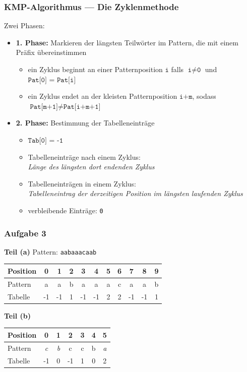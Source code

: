 \documentclass{beamer}
\begin{document}
\begin{frame} \frametitle{KMP-Algorithmus --- Die Zyklenmethode}
	Zwei Phasen:
	\pause
	\begin{itemize}
		\item \textbf{1. Phase:} Markieren der längsten Teilwörter im Pattern, die mit einem Präfix übereinstimmen
		\begin{itemize}
			\item ein Zyklus beginnt an einer Patternposition $\texttt{i}$ falls $\texttt{i} \neq \texttt{0}$ und $\texttt{Pat[0] = Pat[i]}$
			\item ein Zyklus endet an der kleisten Patternposition $\texttt{i+m}$, sodass $\texttt{Pat[m+1]} \neq \texttt{Pat[i+m+1]}$
		\end{itemize}
	\pause
	\item \textbf{2. Phase:} Bestimmung der Tabelleneinträge
	\begin{itemize}
		\item $\texttt{Tab[0] = -1}$
		\item Tabelleneinträge nach einem Zyklus: \\
		\textit{Länge des längsten dort endenden Zyklus}
		\item Tabelleneinträgen in einem Zyklus: \\
		\textit{Tabelleneintrag der derzeitigen Position im längsten laufenden Zyklus}
		\item verbleibende Einträge: \texttt{0}
	\end{itemize}
	\end{itemize}
\end{frame}
\begin{frame} \frametitle{Aufgabe 3}
	\textbf{Teil (a)} \hspace{3em}
	Pattern: {\large \texttt{aabaaacaab}} \\[1em]
	\pause
	
	\begin{center}
		\begin{tabular}{l|cccccccccc}
			Position &  0 &  1 &  2 &  3 &  4 &  5 &  6 &  7 &  8 &  9 \\ \hline
			Pattern  &  a &  a &  b &  a &  a &  a &  c &  a &  a &  b \\ \hline
			Tabelle  & -1 & -1 &  1 & -1 & -1 &  2 &  2 & -1 & -1 &  1 \\
		\end{tabular}
	\end{center}
	
	\pause

	\textbf{Teil (b)}
	\begin{center}
		\begin{tabular}{l|cccccc}
			Position &  0 &  1 &  2 &  3 &  4 &  5 \\ \hline
			Pattern  &  \textit{c} &  \textit{b} &  c &  c &  b &  \textit{a} \\ \hline
			Tabelle  & -1 &  0 & -1 &  1 &  0 &  2 \\
		\end{tabular}
	\end{center}
	
\end{frame}
\end{document}
